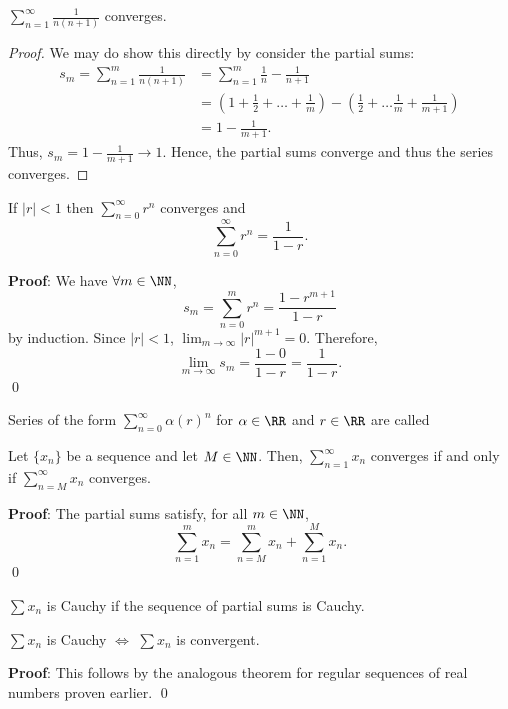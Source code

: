\begin{example}
$\sum_{n=1}^\infty \frac{1}{n(n+1)}$ converges.
\end{example}
\begin{proof}
We may do show this directly by consider the partial sums:
\begin{align*}
    s_m = \sum_{n=1}^m \frac{1}{n(n+1)} &= \sum_{n=1}^m \frac{1}{n} - \frac{1}{n+1} \\
    &= \left(1+\frac{1}{2} + \dots + \frac{1}{m}\right) -\left(\frac{1}{2} + \dots \frac{1}{m} +\frac{1}{m+1} \right) \\
    &= 1- \frac{1}{m+1}.
\end{align*}
Thus, $s_m = 1-\frac{1}{m+1} \to 1$. Hence, the partial sums converge and thus the series converges.
\end{proof}

\begin{theorem}
If $|r| < 1$ then $\sum_{n=0}^\infty r^n$ converges and 
\[
\sum_{n=0}^\infty r^n = \frac{1}{1-r}.
\]
\end{theorem}
\textbf{Proof}: We have $\forall m\in \NN$, 
\[
s_m = \sum_{n=0}^m r^n = \frac{1-r^{m+1}}{1-r}
\]
by induction. Since $|r|<1$, $\lim_{m\to \infty} |r|^{m+1} = 0$. Therefore, 
\[
\lim_{m\to \infty} s_m = \frac{1-0}{1-r} = \frac{1}{1-r}.
\]\qed 

\begin{remark}
Series of the form $\sum_{n=0}^\infty \alpha (r)^{n}$ for $\alpha \in \RR$ and $r\in \RR$ are called 
\end{remark}

\begin{theorem}
Let $\{x_n\}$ be a sequence and let $M \in \NN$. Then, $\sum_{n=1}^\infty x_n$ converges if and only if $\sum_{n=M}^\infty x_n$ converges. 
\end{theorem}
\textbf{Proof}: The partial sums satisfy, for all $m\in \NN$, 
\[
\sum_{n=1}^m x_n = \sum_{n=M}^m x_n + \sum_{n=1}^M x_n.
\]
\qed 

\begin{definition}
$\sum x_n$ is Cauchy if the sequence of partial sums is Cauchy.
\end{definition}

\begin{theorem}
$\sum x_n$ is Cauchy $\iff$ $\sum x_n$ is convergent.
\end{theorem}
\textbf{Proof}: This follows by the analogous theorem for regular sequences of real numbers proven earlier. \qed


